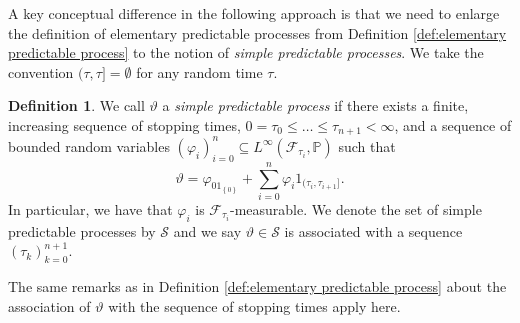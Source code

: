 \documentclass[11pt,a4paper,twoside,openany]{report}
\numberwithin{equation}{section}
\theoremstyle{plain} %
\theoremstyle{definition} %
\newtheorem{definition}[theorem]{Definition}
\theoremstyle{remark} %
\begin{document}
A key conceptual difference in the following approach is that we need to enlarge the definition of elementary predictable processes from Definition \ref{def:elementary predictable process} to the notion of \textit{simple predictable processes}. We take the convention \((\tau,\tau]=\emptyset\) for any random time \(\tau\).

\begin{definition}\label{def:simple predictable process}
    We call \(\vartheta\) a \textit{simple predictable process} if there exists a finite, increasing sequence of stopping times, \(0=\tau_0\leq\dots\leq\tau_{n+1}<\infty\), and a sequence of bounded random variables \((\varphi_i)_{i=0}^n\subseteq L^{\infty}(\mathcal{F}_{\tau_i},\mathbb{P})\) such that 
    \begin{equation*}
        \vartheta = \varphi_01_{\left\{0\right\}}+\sum_{i=0}^n\varphi_i1_{(\tau_i,\tau_{i+1}]}.
    \end{equation*}
In particular, we have that \(\varphi_i\) is \(\mathcal{F}_{\tau_i}\)-measurable. We denote the set of simple predictable processes by \(\mathcal{S}\) and we say \(\vartheta\in\mathcal{S}\) is associated with a sequence \((\tau_k)_{k=0}^{n+1}\).
\end{definition}
The same remarks as in Definition \ref{def:elementary predictable process} about the association of \(\vartheta\) with the sequence of stopping times apply here. 
\end{document}
